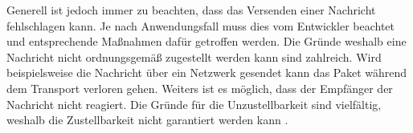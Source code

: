 Generell ist jedoch immer zu beachten, dass das Versenden einer Nachricht fehlschlagen kann. Je nach Anwendungsfall muss dies vom Entwickler beachtet und entsprechende Maßnahmen dafür getroffen werden. Die Gründe weshalb eine Nachricht nicht ordnungsgemäß zugestellt werden kann sind zahlreich. Wird beispielsweise die Nachricht über ein Netzwerk gesendet kann das Paket während dem Transport verloren gehen. Weiters ist es möglich, dass der Empfänger der Nachricht nicht reagiert. Die Gründe für die Unzustellbarkeit sind vielfältig, weshalb die Zustellbarkeit nicht garantiert werden kann \citep{kuhn2017reactive}.







 